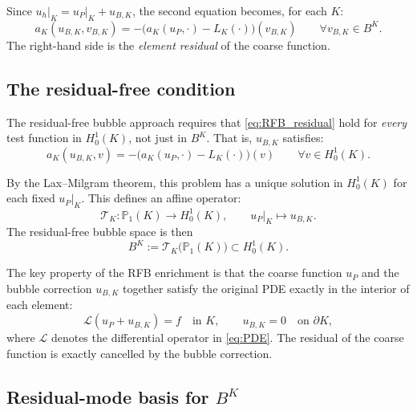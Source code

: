 \documentclass[11pt]{article}
\newcommand{\calL}{\mathcal{L}}
\newcommand{\calT}{\mathcal{T}}
\theoremstyle{remark}
\begin{document}
Since $u_h\big|_K = u_P\big|_K + u_{B,K}$, the second equation becomes, for each $K$:
\begin{equation}\label{eq:RFB_residual}
a_K(u_{B,K}, v_{B,K}) = -\bigl(a_K(u_P, \cdot) - L_K(\cdot)\bigr)(v_{B,K}) \qquad \forall v_{B,K} \in B^K.
\end{equation}
The right-hand side is the \emph{element residual} of the coarse function.

\subsection{The residual-free condition}
\label{subsec:RFB_condition}

The residual-free bubble approach \cite{babuska1994special,brezzi1994further} requires that \eqref{eq:RFB_residual} hold for \emph{every} test function in $H_0^1(K)$, not just in $B^K$. That is, $u_{B,K}$ satisfies:
\begin{equation}\label{eq:RFB_exact}
a_K(u_{B,K}, v) = -\bigl(a_K(u_P, \cdot) - L_K(\cdot)\bigr)(v) \qquad \forall v \in H_0^1(K).
\end{equation}

By the Lax--Milgram theorem, this problem has a unique solution in $H_0^1(K)$ for each fixed $u_P\big|_K$. This defines an affine operator:
\begin{equation}
\calT_K : \mathbb{P}_1(K) \to H_0^1(K), \qquad u_P\big|_K \mapsto u_{B,K}.
\end{equation}
The residual-free bubble space is then
\begin{equation}
B^K := \calT_K\bigl(\mathbb{P}_1(K)\bigr) \subset H_0^1(K).
\end{equation}

The key property of the RFB enrichment is that the coarse function $u_P$ and the bubble correction $u_{B,K}$ together satisfy the original PDE exactly in the interior of each element:
\begin{equation}
\calL(u_P + u_{B,K}) = f \quad \text{in } K, \qquad u_{B,K} = 0 \quad \text{on } \partial K,
\end{equation}
where $\calL$ denotes the differential operator in \eqref{eq:PDE}. The residual of the coarse function is exactly cancelled by the bubble correction.

\subsection{Residual-mode basis for $B^K$}
\label{subsec:residual_modes}
\end{document}
